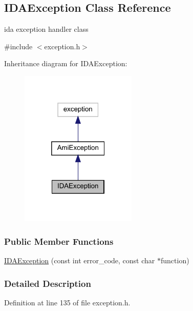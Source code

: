 \hypertarget{classamici_1_1_i_d_a_exception}{}\subsection{I\+D\+A\+Exception Class Reference}
\label{classamici_1_1_i_d_a_exception}


ida exception handler class  




{\ttfamily \#include $<$exception.\+h$>$}



Inheritance diagram for I\+D\+A\+Exception\+:
\nopagebreak
\begin{figure}[H]
\begin{center}
\leavevmode
\includegraphics[width=157pt]{classamici_1_1_i_d_a_exception__inherit__graph}
\end{center}
\end{figure}
\subsubsection*{Public Member Functions}
\begin{DoxyCompactItemize}
\item 
\mbox{\hyperlink{classamici_1_1_i_d_a_exception_ac01f061945cc83140822b1e6c69761fb}{I\+D\+A\+Exception}} (const int error\+\_\+code, const char $\ast$function)
\end{DoxyCompactItemize}


\subsubsection{Detailed Description}


Definition at line 135 of file exception.\+h.



